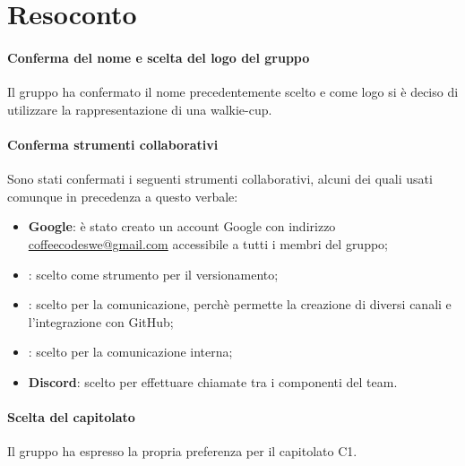 \documentclass{article}
\begin{document}
\section{Resoconto}%
\label{resoconto}
\paragraph*{Conferma del nome e scelta del logo del gruppo}
Il gruppo ha confermato il nome precedentemente scelto e come logo si è deciso di utilizzare la rappresentazione di una walkie-cup.

\paragraph*{Conferma strumenti collaborativi}
Sono stati confermati i seguenti strumenti collaborativi, alcuni dei quali usati comunque in precedenza a questo verbale:
\begin{itemize}
  \item \textbf{ Google}: è stato creato un account Google con indirizzo \href{mailto:coffeecodeswe@gmail.com}{coffeecodeswe@gmail.com} accessibile a tutti i membri del gruppo;
  \item \textbf{}: scelto come strumento per il versionamento;
  \item \textbf{}: scelto per la comunicazione, perchè permette la creazione di diversi canali e l'integrazione con GitHub;
  \item \textbf{}: scelto per la comunicazione interna;
  \item \textbf{Discord}: scelto per effettuare chiamate tra i componenti del team.
\end{itemize}

\paragraph*{Scelta del capitolato}
Il gruppo ha espresso la propria preferenza per il capitolato C1.
\end{document}
